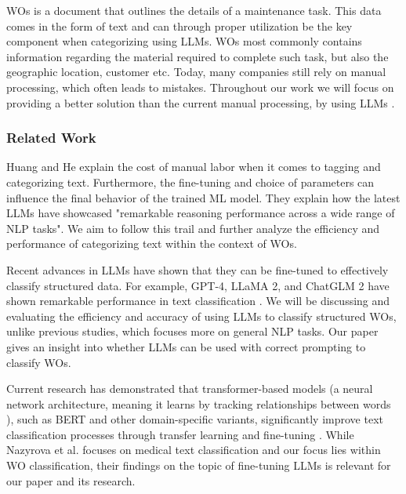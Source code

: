 WOs is a document that outlines the details of a maintenance task.
This data comes in the form of text and can through proper utilization be the
key component when categorizing using LLMs.
WOs most commonly contains information regarding the material required to
complete such task, but also the geographic location, customer etc.
Today, many companies still rely on manual processing, which often leads to
mistakes.
Throughout our work we will focus on providing a better solution than the
current manual processing, by using LLMs \cite{ibm2023} \cite{li2024}.

\subsubsection{Related Work}

Huang and He \cite{huang2024} explain the cost of manual labor when it comes to
tagging and categorizing text.
Furthermore, the fine-tuning and choice of parameters can influence the final
behavior of the trained ML model.
They explain how the latest LLMs have showcased "remarkable reasoning
performance across a wide range of NLP tasks".
We aim to follow this trail and further analyze the efficiency and performance
of categorizing text within the context of WOs.

\bigskip
Recent advances in LLMs have shown that they can be fine-tuned to effectively
classify structured data.
For example, GPT-4, LLaMA 2, and ChatGLM 2 have shown remarkable performance in
text classification \cite{zhang2024}.
We will be discussing and evaluating the efficiency and accuracy of using LLMs
to classify structured WOs, unlike previous studies, which focuses more on
general NLP tasks.
Our paper gives an insight into whether LLMs can be used with correct prompting
to classify WOs.

\bigskip
Current research has demonstrated that transformer-based models
(a neural network architecture, meaning it learns by tracking relationships
between words \cite{merritt2022}),
such as BERT and other domain-specific variants, significantly improve text
classification processes through transfer learning and fine-tuning
\cite{nazyrova2024}.
While Nazyrova et al. focuses on medical text classification and our focus lies
within WO classification, their findings on the topic of fine-tuning LLMs is
relevant for our paper and its research.
